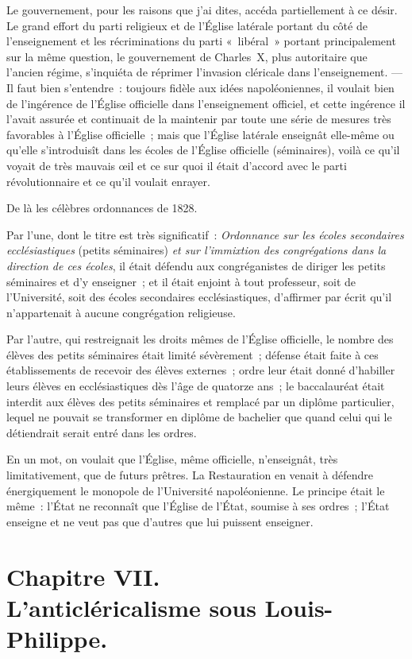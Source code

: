 \documentclass[french,twoside]{book} %
\begin{document}
\noindent Le gouvernement, pour les raisons que j’ai dites, accéda partiellement à ce désir. Le grand effort du parti religieux et de l’Église latérale portant du côté de l’enseignement et les récriminations du parti « libéral » portant principalement sur la même question, le gouvernement de Charles X, plus autoritaire que l’ancien régime, s’inquiéta de réprimer l’invasion cléricale dans l’enseignement. — Il faut bien s’entendre : toujours fidèle aux idées napoléoniennes, il voulait bien de l’ingérence de l’Église officielle dans l’enseignement officiel, et cette ingérence il l’avait assurée et continuait de la maintenir par toute une série de mesures très favorables à l’Église officielle ; mais que l’Église latérale enseignât elle-même ou qu’elle s’introduisît dans les écoles de l’Église  officielle (séminaires), voilà ce qu’il voyait de très mauvais œil et ce sur quoi il était d’accord avec le parti révolutionnaire et ce qu’il voulait enrayer.\par
De là les célèbres ordonnances de 1828.\par
Par l’une, dont le titre est très significatif : \emph{Ordonnance sur les écoles secondaires ecclésiastiques} (petits séminaires) {\itshape et sur l’immixtion des congrégations dans la direction de ces écoles}, il était défendu aux congréganistes de diriger les petits séminaires et d’y enseigner ; et il était enjoint à tout professeur, soit de l’Université, soit des écoles secondaires ecclésiastiques, d’affirmer par écrit qu’il n’appartenait à aucune congrégation religieuse.\par
Par l’autre, qui restreignait les droits mêmes de l’Église officielle, le nombre des élèves des petits séminaires était limité sévèrement ; défense était faite à ces établissements de recevoir des élèves externes ; ordre leur était donné d’habiller leurs élèves en ecclésiastiques dès l’âge de quatorze ans ; le baccalauréat était interdit aux élèves des petits séminaires et remplacé par un diplôme particulier, lequel ne pouvait se transformer en diplôme de bachelier que quand celui qui le détiendrait serait entré dans les ordres.\par
En un mot, on voulait que l’Église, même officielle, n’enseignât, très limitativement, que de  futurs prêtres. La Restauration en venait à défendre énergiquement le monopole de l’Université napoléonienne. Le principe était le même : l’État ne reconnaît que l’Église de l’État, soumise à ses ordres ; l’État enseigne et ne veut pas que d’autres que lui puissent enseigner.
 \section[{Chapitre VII. L’anticléricalisme sous Louis-Philippe.}]{Chapitre VII.\\
L’anticléricalisme sous Louis-Philippe.}\renewcommand{\leftmark}{Chapitre VII.\\
L’anticléricalisme sous Louis-Philippe.}
\end{document}

